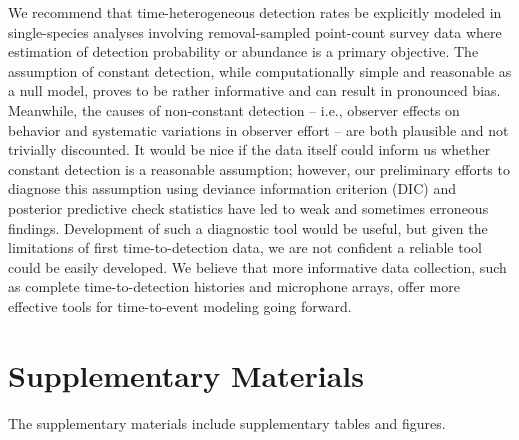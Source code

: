 \documentclass[12pt]{article}
\begin{document}
We recommend that time-heterogeneous detection rates be explicitly modeled in single-species analyses involving removal-sampled point-count survey data where estimation of detection probability or abundance is a primary objective.  
The assumption of constant detection, while computationally simple and reasonable as a null model, proves to be rather informative and can result in pronounced bias.  
Meanwhile, the causes of non-constant detection -- i.e., observer effects on behavior and systematic variations in observer effort -- are both plausible and not trivially discounted.  
It would be nice if the data itself could inform us whether constant detection is a reasonable assumption; however, our preliminary efforts to diagnose this assumption using deviance information criterion (DIC) and posterior predictive check statistics have led to weak and sometimes erroneous findings.
Development of such a diagnostic tool would be useful, but given the limitations of first time-to-detection data, we are not confident a reliable tool could be easily developed.  
We believe that more informative data collection, such as complete time-to-detection histories and microphone arrays, offer more effective tools for time-to-event modeling going forward.


\section{Supplementary Materials}

The supplementary materials include supplementary tables and figures. 




\end{document}
